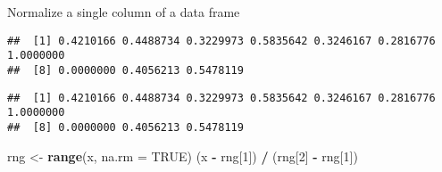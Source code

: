 \documentclass[
]{article}
\newenvironment{Shaded}{\begin{snugshade}}{\end{snugshade}}
\newcommand{\AttributeTok}[1]{\textcolor[rgb]{0.13,0.29,0.53}{#1}}
\newcommand{\ConstantTok}[1]{\textcolor[rgb]{0.56,0.35,0.01}{#1}}
\newcommand{\DecValTok}[1]{\textcolor[rgb]{0.00,0.00,0.81}{#1}}
\newcommand{\FunctionTok}[1]{\textcolor[rgb]{0.13,0.29,0.53}{\textbf{#1}}}
\newcommand{\NormalTok}[1]{#1}
\newcommand{\OtherTok}[1]{\textcolor[rgb]{0.56,0.35,0.01}{#1}}
\newcommand{\SpecialCharTok}[1]{\textcolor[rgb]{0.81,0.36,0.00}{\textbf{#1}}}
\begin{document}
Normalize a single column of a data frame

\begin{Shaded}
\end{Shaded}

\begin{verbatim}
##  [1] 0.4210166 0.4488734 0.3229973 0.5835642 0.3246167 0.2816776 1.0000000
##  [8] 0.0000000 0.4056213 0.5478119
\end{verbatim}

\begin{Shaded}
\end{Shaded}

\begin{verbatim}
##  [1] 0.4210166 0.4488734 0.3229973 0.5835642 0.3246167 0.2816776 1.0000000
##  [8] 0.0000000 0.4056213 0.5478119
\end{verbatim}

\begin{Shaded}
\begin{Highlighting}[]
\NormalTok{rng }\OtherTok{\textless{}{-}} \FunctionTok{range}\NormalTok{(x, }\AttributeTok{na.rm =} \ConstantTok{TRUE}\NormalTok{)}
\NormalTok{(x }\SpecialCharTok{{-}}\NormalTok{ rng[}\DecValTok{1}\NormalTok{]) }\SpecialCharTok{/}\NormalTok{ (rng[}\DecValTok{2}\NormalTok{] }\SpecialCharTok{{-}}\NormalTok{ rng[}\DecValTok{1}\NormalTok{])}
\end{Highlighting}
\end{Shaded}
\end{document}
